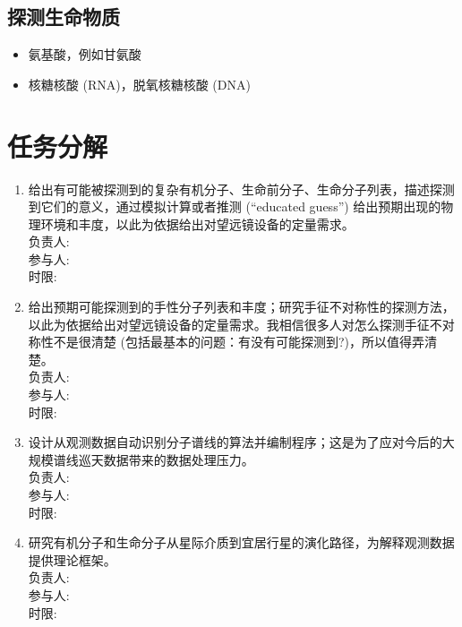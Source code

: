\documentclass{article}
\begin{document}
\subsection{探测生命物质}
  \begin{itemize}
    \item 氨基酸，例如甘氨酸
    \item 核糖核酸 (RNA)，脱氧核糖核酸 (DNA)
  \end{itemize}

\section{任务分解}

\begin{enumerate}
  \item 给出有可能被探测到的复杂有机分子、生命前分子、生命分子列表，描述探测到它们的意义，通过模拟计算或者推测 (“educated guess”) 给出预期出现的物理环境和丰度，以此为依据给出对望远镜设备的定量需求。\\
  负责人: \\
  参与人: \\
  时限:
  \item 给出预期可能探测到的手性分子列表和丰度；研究手征不对称性的探测方法，以此为依据给出对望远镜设备的定量需求。我相信很多人对怎么探测手征不对称性不是很清楚 (包括最基本的问题：有没有可能探测到?)，所以值得弄清楚。\\
  负责人: \\
  参与人: \\
  时限:
  \item 设计从观测数据自动识别分子谱线的算法并编制程序；这是为了应对今后的大规模谱线巡天数据带来的数据处理压力。\\
  负责人: \\
  参与人: \\
  时限:
  \item 研究有机分子和生命分子从星际介质到宜居行星的演化路径，为解释观测数据提供理论框架。\\
  负责人: \\
  参与人: \\
  时限:
\end{enumerate}
\end{document}
